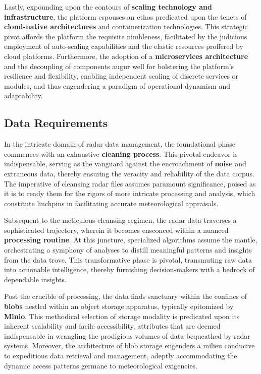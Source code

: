 Lastly, expounding upon the contours of \textbf{scaling technology and
    infrastructure}, the platform espouses an ethos predicated upon the tenets
    of \textbf{cloud-native architectures} and containerization technologies.
    This strategic pivot affords the platform the requisite nimbleness,
    facilitated by the judicious employment of auto-scaling capabilities and the
    elastic resources proffered by cloud platforms. Furthermore, the adoption of
    a \textbf{microservices architecture} and the decoupling of components augur
    well for bolstering the platform's resilience and flexibility, enabling
    independent scaling of discrete services or modules, and thus engendering a
    paradigm of operational dynamism and adaptability.

\subsection{Data Requirements}
In the intricate domain of radar data management, the foundational phase
commences with an exhaustive \textbf{cleaning process}. This pivotal endeavor is
indispensable, serving as the vanguard against the encroachment of
\textbf{noise} and extraneous data, thereby ensuring the veracity and
reliability of the data corpus. The imperative of cleansing radar files assumes
paramount significance, poised as it is to ready them for the rigors of more
intricate processing and analysis, which constitute linchpins in facilitating
accurate meteorological appraisals.

Subsequent to the meticulous cleansing regimen, the radar data traverses a
sophisticated trajectory, wherein it becomes ensconced within a nuanced
\textbf{processing routine}. At this juncture, specialized algorithms assume the
mantle, orchestrating a symphony of analyses to distill meaningful patterns and
insights from the data trove. This transformative phase is pivotal, transmuting
raw data into actionable intelligence, thereby furnishing decision-makers with a
bedrock of dependable insights.

Post the crucible of processing, the data finds sanctuary within the confines of
\textbf{blobs} nestled within an object storage apparatus, typically epitomized
by \textbf{Minio}. This methodical selection of storage modality is predicated
upon its inherent scalability and facile accessibility, attributes that are
deemed indispensable in wrangling the prodigious volumes of data bequeathed by
radar systems. Moreover, the architecture of blob storage engenders a milieu
conducive to expeditious data retrieval and management, adeptly accommodating
the dynamic access patterns germane to meteorological exigencies.

